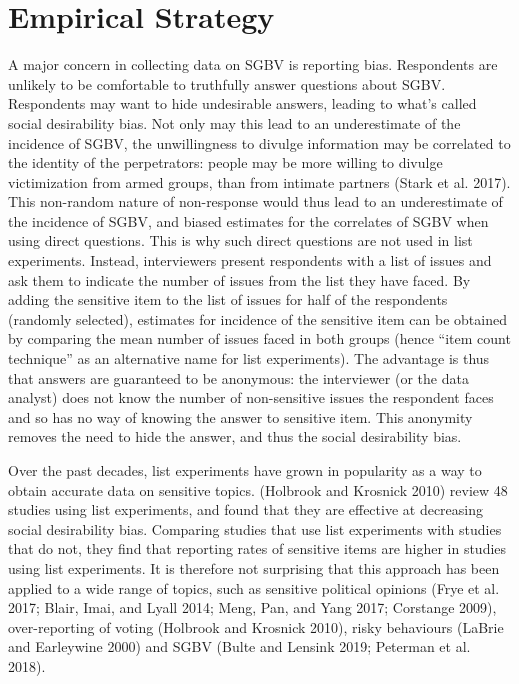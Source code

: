 \documentclass[
]{article}
\begin{document}
\section*{Empirical Strategy}\label{empirical-strategy}

A major concern in collecting data on SGBV is reporting bias.
Respondents are unlikely to be comfortable to truthfully answer
questions about SGBV. Respondents may want to hide undesirable answers,
leading to what's called social desirability bias. Not only may this
lead to an underestimate of the incidence of SGBV, the unwillingness to
divulge information may be correlated to the identity of the
perpetrators: people may be more willing to divulge victimization from
armed groups, than from intimate partners (Stark et al. 2017). This
non-random nature of non-response would thus lead to an underestimate of
the incidence of SGBV, and biased estimates for the correlates of SGBV
when using direct questions. This is why such direct questions are not
used in list experiments. Instead, interviewers present respondents with
a list of issues and ask them to indicate the number of issues from the
list they have faced. By adding the sensitive item to the list of issues
for half of the respondents (randomly selected), estimates for incidence
of the sensitive item can be obtained by comparing the mean number of
issues faced in both groups (hence ``item count technique'' as an
alternative name for list experiments). The advantage is thus that
answers are guaranteed to be anonymous: the interviewer (or the data
analyst) does not know the number of non-sensitive issues the respondent
faces and so has no way of knowing the answer to sensitive item. This
anonymity removes the need to hide the answer, and thus the social
desirability bias.

Over the past decades, list experiments have grown in popularity as a
way to obtain accurate data on sensitive topics. (Holbrook and Krosnick
2010) review 48 studies using list experiments, and found that they are
effective at decreasing social desirability bias. Comparing studies that
use list experiments with studies that do not, they find that reporting
rates of sensitive items are higher in studies using list experiments.
It is therefore not surprising that this approach has been applied to a
wide range of topics, such as sensitive political opinions (Frye et al.
2017; Blair, Imai, and Lyall 2014; Meng, Pan, and Yang 2017; Corstange
2009), over-reporting of voting (Holbrook and Krosnick 2010), risky
behaviours (LaBrie and Earleywine 2000) and SGBV (Bulte and Lensink
2019; Peterman et al. 2018).
\end{document}
